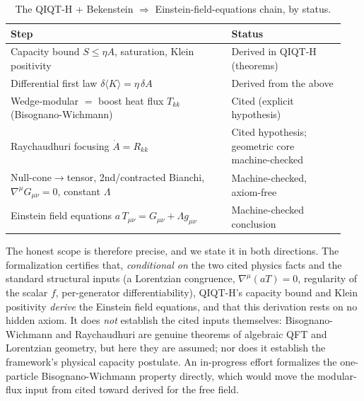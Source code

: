 \documentclass[11pt]{article}
\begin{document}
\begin{table}[ht]
\centering
\caption{The QIQT-H + Bekenstein $\Rightarrow$ Einstein-field-equations chain, by status.}
\label{tab:grchain}
\begin{tabular}{@{}p{0.62\linewidth}p{0.32\linewidth}@{}}
\toprule
Step & Status \\
\midrule
Capacity bound $S\le\eta A$, saturation, Klein positivity & Derived in QIQT-H (theorems) \\
Differential first law $\delta\langle K\rangle=\eta\,\delta A$ & Derived from the above \\
Wedge-modular $=$ boost heat flux $T_{kk}$ (Bisognano-Wichmann) & Cited (explicit hypothesis) \\
Raychaudhuri focusing $\dot{A}=R_{kk}$ & Cited hypothesis; geometric core machine-checked \\
Null-cone$\to$tensor, 2nd/contracted Bianchi, $\nabla^\mu G_{\mu\nu}=0$, constant $\Lambda$ & Machine-checked, axiom-free \\
Einstein field equations $a\,T_{\mu\nu}=G_{\mu\nu}+\Lambda g_{\mu\nu}$ & Machine-checked conclusion \\
\bottomrule
\end{tabular}
\end{table}

The honest scope is therefore precise, and we state it in both directions. The formalization certifies
that, \emph{conditional on} the two cited physics facts and the standard structural inputs (a
Lorentzian congruence, $\nabla^\mu(aT)=0$, regularity of the scalar $f$, per-generator
differentiability), QIQT-H's capacity bound and Klein positivity \emph{derive} the Einstein field
equations, and that this derivation rests on no hidden axiom. It does \emph{not} establish the cited
inputs themselves: Bisognano-Wichmann and Raychaudhuri are genuine theorems of algebraic QFT and
Lorentzian geometry, but here they are assumed; nor does it establish the framework's physical
capacity postulate. An in-progress effort formalizes the one-particle Bisognano-Wichmann property
directly, which would move the modular-flux input from cited toward derived for the free field.
\end{document}
